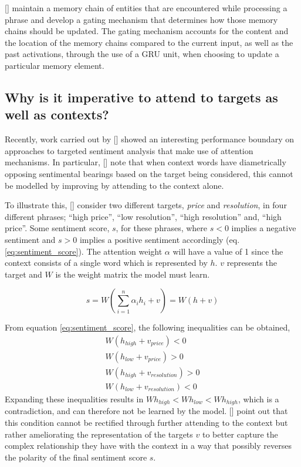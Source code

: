 \documentclass[12pt, a4paper]{report}
\theoremstyle{definition}
\theoremstyle{definition}%
\theoremstyle{definition}%
\theoremstyle{definition}%
\theoremstyle{definition}%
\theoremstyle{definition}%
\renewcommand{\cite}[1]{[\citealp{#1}]}
\begin{document}
\cite{liu2018} maintain a memory chain of entities that are encountered while processing a phrase and develop a gating mechanism that determines how those memory chains should be updated. The gating mechanism accounts for the content and the location of the memory chains compared to the current input, as well as the past activations, through the use of a GRU unit, when choosing to update a particular memory element.

\subsection{Why is it imperative to attend to targets as well as contexts?}
Recently, work carried out by \cite{wang2018} showed an interesting performance boundary on approaches to targeted sentiment analysis that make use of attention mechanisms. In particular, \cite{wang2018} note that when context words have diametrically opposing sentimental bearings based on the target being considered, this cannot be modelled by improving by attending to the context alone.

To illustrate this, \cite{wang2018} consider two different targets, \textit{price} and \textit{resolution}, in four different phrases; \enquote{high price}, \enquote{low resolution}, \enquote{high resolution} and, \enquote{high price}. Some sentiment score, $s$, for these phrases, where $s < 0$ implies a negative sentiment and $s > 0$ implies a positive sentiment accordingly (eq. \ref{eq:sentiment_score}). The attention weight $\alpha$ will have a value of 1 since the context consists of a single word which is represented by $h$. $v$ represents the target and $W$ is the weight matrix the model must learn.

\begin{equation} \label{eq:sentiment_score}
	s = W(\sum_{i=1}^{n}\alpha_{i}h_{i}+v) = W(h+v)
\end{equation}

From equation \ref{eq:sentiment_score}, the following inequalities can be obtained,
\begin{equation*}
	\begin{split}
		W(h_{high}+v_{price}) < 0 \\
		W(h_{low}+v_{price}) > 0 \\
		W(h_{high}+v_{resolution}) > 0 \\
		W(h_{low}+v_{resolution}) < 0
	\end{split}
\end{equation*}
Expanding these inequalities results in $Wh_{high}<Wh_{low}<Wh_{high}$, which is a contradiction, and can therefore not be learned by the model. \cite{wang2018} point out that this condition cannot be rectified through further attending to the context but rather ameliorating the representation of the targets $v$ to better capture the complex relationship they have with the context in a way that possibly reverses the polarity of the final sentiment score $s$.
\end{document}
